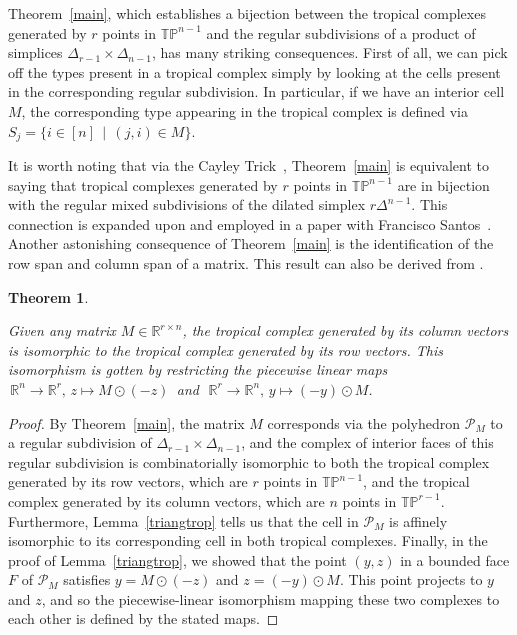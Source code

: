 \documentclass[11pt]{amsart}
\newtheorem{thm}{Theorem}
\newcommand{\RR}{\mathbb{R}}
\newcommand{\TP}{\mathbb{TP}}
\begin{document}
Theorem~\ref{main}, which establishes a bijection between the tropical complexes generated by $r$ points
in $\TP^{n-1}$ and the regular subdivisions of a product of simplices $\Delta_{r-1} \times \Delta_{n-1}$,
has many striking consequences. First of all, we can pick off the types present in a tropical complex 
simply by looking at the cells present in the corresponding regular subdivision. In particular, if we have 
an interior cell $M$, the corresponding type appearing in the tropical complex is defined via $S_j = 
\{i\in [n]\,\mid\,(j,i)\in M\}$. 

It is worth noting that via the Cayley Trick~\cite{San}, 
Theorem~\ref{main} is equivalent to saying that
tropical complexes generated by $r$ points in $\TP^{n-1}$ are in bijection with the regular mixed
subdivisions of the dilated simplex $r\Delta^{n-1}$. This connection is expanded upon and employed in a
paper with Francisco Santos~\cite{DSS}.
Another astonishing consequence of Theorem~\ref{main}
is the identification of
the row span and column span of a matrix. This result can also be derived
from \cite[Theorem 42]{CGQ}.

\begin{thm}\label{polar}

Given any matrix $M\in \RR^{r\times n}$, the tropical complex generated by 
its
column vectors is isomorphic to the tropical complex generated by its row
vectors. This isomorphism is gotten by restricting the piecewise linear
maps $ \, \RR^n \rightarrow \RR^r,\, z \mapsto M\odot (-z) \,$ and $ \,\,
\RR^r \rightarrow \RR^n,\, y \mapsto (-y) \odot M $.

\end{thm}

\begin{proof}
By Theorem~\ref{main}, the matrix $M$ corresponds via the polyhedron
${\mathcal P}_M$ to a regular subdivision of $\Delta_{r-1} \times
\Delta_{n-1}$, and the complex of interior faces of this regular
subdivision is combinatorially isomorphic to both the tropical complex 
generated by its row vectors, which are $r$ points in $\TP^{n-1}$, and 
the tropical complex generated by its 
column vectors, which are $n$ points in $\TP^{r-1}$. Furthermore,
Lemma~\ref{triangtrop} tells us that the cell in ${\mathcal P}_M$ is
affinely isomorphic to its corresponding cell in both tropical complexes.
Finally, in the proof of Lemma~\ref{triangtrop}, we showed that the
point $(y,z)$ in a bounded face $F$ of ${\mathcal P}_M$ satisfies $y =
M\odot (-z)$ and $z = (-y) \odot M$. This point projects to $y$ and $z$,
and so the piecewise-linear isomorphism mapping these two complexes to
each other is defined by the stated maps.  
\end{proof}
\end{document}
